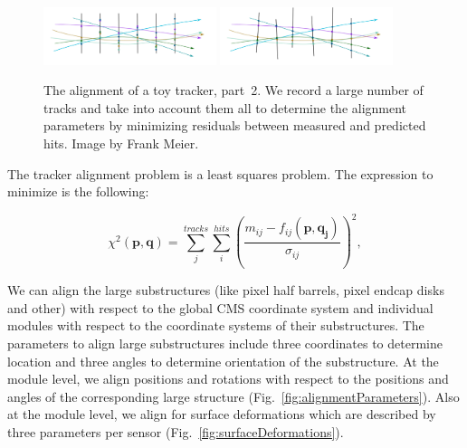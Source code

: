 \begin{figure}[htb]
    \begin{center}
        \includegraphics[width=0.45\textwidth]{../figs/Alignment/toyTracker12.png}
        \includegraphics[width=0.45\textwidth]{../figs/Alignment/toyTracker13.png}
    \end{center}
    \caption{The alignment of a toy tracker, part~2. We record a large number of tracks and take into account them all to determine the alignment parameters by minimizing residuals between measured and predicted hits. Image by Frank Meier.}
    \label{fig:toyTracker_part2}
\end{figure}


The tracker alignment problem is a least squares problem. The expression to minimize is the following:

\begin{equation}
  \chi^2(\mathbf{p},\mathbf{q})=\sum_j^{tracks} \sum_i^{hits} \left( {\frac{m_{ij}-f_{ij}(\mathbf{p},\mathbf{q_j})}{\sigma_{ij}}} \right)^2,
\end{equation}


We can align the large substructures (like pixel half barrels, pixel endcap disks and other) with respect to the global CMS coordinate system and individual modules with respect to the coordinate systems of their substructures. The parameters to align large substructures include three coordinates to determine location and three angles to determine orientation of the substructure. At the module level, we align positions and rotations with respect to the positions and angles of the corresponding large structure (Fig.~\ref{fig:alignmentParameters}). Also at the module level, we align for surface deformations which are described by three parameters per sensor (Fig.~\ref{fig:surfaceDeformations}). 

